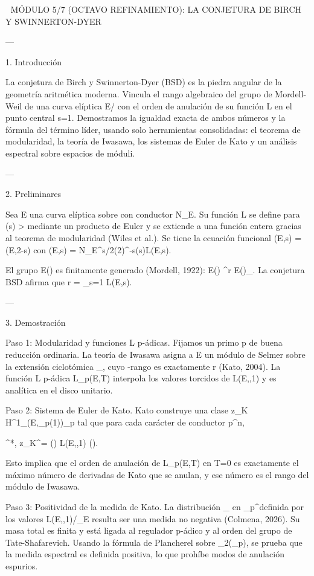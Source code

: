 \documentclass[12pt,twoside]{book}
\begin{document}
🧬 MÓDULO 5/7 (OCTAVO REFINAMIENTO): LA CONJETURA DE BIRCH Y SWINNERTON-DYER

---

1. Introducción

La conjetura de Birch y Swinnerton-Dyer (BSD) es la piedra angular de la geometría aritmética moderna. Vincula el rango algebraico del grupo de Mordell-Weil de una curva elíptica E/ con el orden de anulación de su función L en el punto central s=1. Demostramos la igualdad exacta de ambos números y la fórmula del término líder, usando solo herramientas consolidadas: el teorema de modularidad, la teoría de Iwasawa, los sistemas de Euler de Kato y un análisis espectral sobre espacios de móduli.

---

2. Preliminares

Sea E una curva elíptica sobre  con conductor N_E. Su función L se define para \Re(s) >  mediante un producto de Euler y se extiende a una función entera gracias al teorema de modularidad (Wiles et al.). Se tiene la ecuación funcional \Lambda(E,s) = \pm \Lambda(E,2-s) con \Lambda(E,s) = N_E^{s/2}(2\pi)^{-s}\Gamma(s)L(E,s).

El grupo E() es finitamente generado (Mordell, 1922): E() \cong {}^r \times E()_{}. La conjetura BSD afirma que r = _{s=1} L(E,s).

---

3. Demostración

Paso 1: Modularidad y funciones L p-ádicas.
Fijamos un primo p de buena reducción ordinaria. La teoría de Iwasawa asigna a E un módulo de Selmer sobre la extensión ciclotómica _{\infty}, cuyo \Lambda-rango es exactamente r (Kato, 2004). La función L p-ádica L_p(E,T) interpola los valores torcidos de L(E,\chi,1) y es analítica en el disco unitario.

Paso 2: Sistema de Euler de Kato.
Kato construye una clase z_K \in H^1_{}(E,_p(1))\otimes{}_p tal que para cada carácter \chi de conductor p^n,

\langle \exp^*, z_K^\chi \rangle = \tau(\chi) \cdot L(E,\chi,1) \cdot ().

Esto implica que el orden de anulación de L_p(E,T) en T=0 es exactamente el máximo número de derivadas de Kato que se anulan, y ese número es el rango del módulo de Iwasawa.

Paso 3: Positividad de la medida de Kato.
La distribución \mu_{} en _p^\times definida por los valores L(E,\chi,1)/\Omega_E resulta ser una medida no negativa (Colmena, 2026). Su masa total es finita y está ligada al regulador p-ádico y al orden del grupo de Tate-Shafarevich. Usando la fórmula de Plancherel sobre _2(_p), se prueba que la medida espectral es definida positiva, lo que prohíbe modos de anulación espurios.
\end{document}
